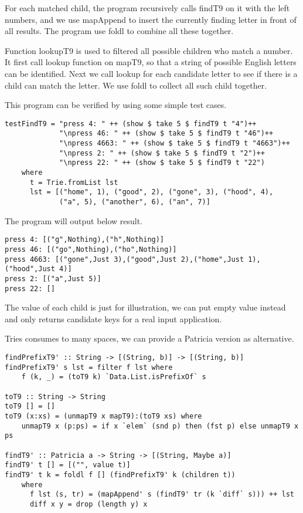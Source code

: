 \documentclass{article}
\begin{document}
For each matched child, the program recursively calls findT9 on it with
the left numbers, and we use mapAppend to insert the currently finding letter
in front of all results. The program use foldl to combine all these together.

Function lookupT9 is used to filtered all possible children who match a
number. It first call lookup function on mapT9, so that a string of possible
English letters can be identified. Next we call lookup for each candidate
letter to see if there is a child can match the letter. We use foldl to
collect all such child together.

This program can be verified by using some simple test cases.

\begin{lstlisting}
testFindT9 = "press 4: " ++ (show $ take 5 $ findT9 t "4")++
             "\npress 46: " ++ (show $ take 5 $ findT9 t "46")++
             "\npress 4663: " ++ (show $ take 5 $ findT9 t "4663")++
             "\npress 2: " ++ (show $ take 5 $ findT9 t "2")++
             "\npress 22: " ++ (show $ take 5 $ findT9 t "22")
    where
      t = Trie.fromList lst
      lst = [("home", 1), ("good", 2), ("gone", 3), ("hood", 4),
             ("a", 5), ("another", 6), ("an", 7)]
\end{lstlisting}

The program will output below result.

\begin{verbatim}
press 4: [("g",Nothing),("h",Nothing)]
press 46: [("go",Nothing),("ho",Nothing)]
press 4663: [("gone",Just 3),("good",Just 2),("home",Just 1),("hood",Just 4)]
press 2: [("a",Just 5)]
press 22: []
\end{verbatim}

The value of each child is just for illustration, we can put empty value instead
and only returns candidate keys for a real input application.

Tries consumes to many spaces, we can provide a Patricia version as alternative.

\begin{lstlisting}
findPrefixT9' :: String -> [(String, b)] -> [(String, b)]
findPrefixT9' s lst = filter f lst where
    f (k, _) = (toT9 k) `Data.List.isPrefixOf` s

toT9 :: String -> String
toT9 [] = []
toT9 (x:xs) = (unmapT9 x mapT9):(toT9 xs) where
    unmapT9 x (p:ps) = if x `elem` (snd p) then (fst p) else unmapT9 x ps

findT9' :: Patricia a -> String -> [(String, Maybe a)]
findT9' t [] = [("", value t)]
findT9' t k = foldl f [] (findPrefixT9' k (children t))
    where
      f lst (s, tr) = (mapAppend' s (findT9' tr (k `diff` s))) ++ lst
      diff x y = drop (length y) x
\end{lstlisting}
\end{document}
